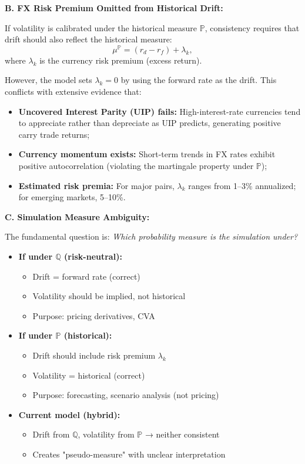 \textbf{B. FX Risk Premium Omitted from Historical Drift:}

If volatility is calibrated under the historical measure $\mathbb{P}$, consistency requires that drift should also reflect the historical measure:
\begin{equation}
	\mu^{\mathbb{P}} = (r_d - r_f) + \lambda_k,
\end{equation}
where $\lambda_k$ is the currency risk premium (excess return).

However, the model sets $\lambda_k = 0$ by using the forward rate as the drift. This conflicts with extensive evidence that:
\begin{itemize}
	\item \textbf{Uncovered Interest Parity (UIP) fails:} High-interest-rate currencies tend to appreciate rather than depreciate as UIP predicts, generating positive carry trade returns;
	\item \textbf{Currency momentum exists:} Short-term trends in FX rates exhibit positive autocorrelation (violating the martingale property under $\mathbb{P}$);
	\item \textbf{Estimated risk premia:} For major pairs, $\lambda_k$ ranges from 1--3\% annualized; for emerging markets, 5--10\%.
\end{itemize}

\textbf{C. Simulation Measure Ambiguity:}

The fundamental question is: \textit{Which probability measure is the simulation under?}

\begin{itemize}
	\item \textbf{If under $\mathbb{Q}$ (risk-neutral):}
	\begin{itemize}
		\item[$\checkmark$] Drift = forward rate (correct)
		\item[$\times$] Volatility should be implied, not historical
		\item[$\times$] Purpose: pricing derivatives, CVA
	\end{itemize}
	
	\item \textbf{If under $\mathbb{P}$ (historical):}
	\begin{itemize}
		\item[$\times$] Drift should include risk premium $\lambda_k$
		\item[$\checkmark$] Volatility = historical (correct)
		\item[$\times$] Purpose: forecasting, scenario analysis (not pricing)
	\end{itemize}
	
	\item \textbf{Current model (hybrid):}
	\begin{itemize}
		\item[?] Drift from $\mathbb{Q}$, volatility from $\mathbb{P}$ → neither consistent
		\item[!] Creates "pseudo-measure" with unclear interpretation
	\end{itemize}
\end{itemize}


